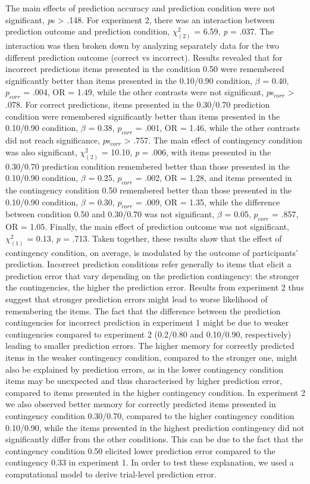 \documentclass[a4paper,12pt]{article}
\begin{document}
The main effects of prediction accuracy and prediction condition were not significant, \textit{p}s > .148.  
For experiment 2, there was an interaction between prediction outcome and prediction condition, $\chi^2_{(2)}$ = 6.59, \textit{p} = .037. The interaction was then broken down by analyzing separately data for the two different prediction outcome (correct vs incorrect). Results revealed that for incorrect predictions items presented in the condition 0.50 were remembered significantly better than items presented in the 0.10/0.90 condition, $\beta$ = 0.40, $p_{corr}$ = .004, OR = 1.49, while the other contrasts were not significant, $p$s$_{corr}$ > .078. For correct predictions, items presented in the 0.30/0.70 prediction condition were remembered significantly better than items presented in the 0.10/0.90 condition, $\beta$ = 0.38, $p_{corr}$ = .001, OR = 1.46, while the other contrasts did not reach significance, $p$s$_{corr}$ > .757. The main effect of contingency condition was also significant, $\chi^2_{(2)}$ = 10.10, \textit{p} = .006, with items presented in the 0.30/0.70 prediction condition remembered better than those presented in the 0.10/0.90 condition, $\beta$ = 0.25, $p_{corr}$ = .002, OR = 1.28, and items presented in the contingency condition 0.50 remembered better than those presented in the 0.10/0.90 condition, $\beta$ = 0.30, $p_{corr}$ = .009, OR = 1.35, while the difference between condition 0.50 and 0.30/0.70 was not significant, $\beta$ = 0.05, $p_{corr}$ = .857, OR = 1.05. Finally, the main effect of prediction outcome was not significant, $\chi^2_{(1)}$ = 0.13, \textit{p} = .713. 
Taken together, these results show that the effect of contingency condition, on average, is modulated by the outcome of participants' prediction. Incorrect prediction conditions refer generally to items that elicit a prediction error that vary depending on the prediction contingency: the stronger the contingencies, the higher the prediction error. Results from experiment 2 thus suggest that stronger prediction errors might lead to worse likelihood of remembering the items. The fact that the difference between the prediction contingencies for incorrect prediction in experiment 1 might be due to weaker contingencies compared to experiment 2 (0.2/0.80 and 0.10/0.90, respectively) leading to smaller prediction errors. The higher memory for correctly predicted items in the weaker contingency condition, compared to the stronger one, might also be explained by prediction errors, as in the lower contingency condition items may be unexpected and thus characterised by higher prediction error, compared to items presented in the higher contingency condition. In experiment 2 we also observed better memory for correctly predicted items presented in contingency condition 0.30/0.70, compared to the higher contingency condition 0.10/0.90, while the items presented in the highest prediction contingency did not significantly differ from the other conditions. This can be due to the fact that the contingency condition 0.50 elicited lower prediction error compared to the contingency 0.33 in experiment 1. In order to test these explanation, we used a computational model to derive trial-level prediction error.  
\end{document}
